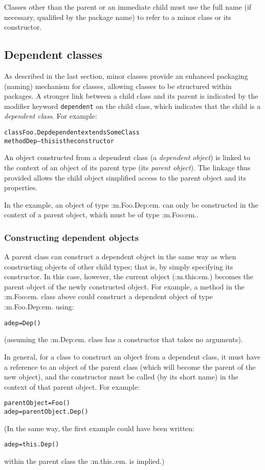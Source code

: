 Classes other than the parent or an immediate child must use the full
name (if necessary, qualified by the package name) to refer to a minor
class or its constructor.
\subsection{Dependent classes}\label{"id"}
\index{,}
\index{,}
\index{,}
 
As described in the last section, minor classes provide an enhanced
packaging (naming) mechanism for classes, allowing classes to be
structured within packages.  A stronger link between a child class and
its parent is indicated by the modifier keyword \texttt{dependent} on the
child class, which indicates that the child is a \emph{dependent class}.
For example:
\begin{alltt}
class Foo.Dep dependent extends SomeClass
  method Dep   -- this is the constructor
\end{alltt}
 
An object constructed from a dependent class (a \emph{dependent
object}) is linked to the context of an object of its parent
type (its \emph{parent object}).
The linkage thus provided allows the child object simplified access to
the parent object and its properties.
 
In the example, an object of type :m.Foo.Dep:em. can only be constructed
in the context of a parent object, which must be of type :m.Foo:em..
\subsubsection{Constructing dependent objects}
 
A parent class can construct a dependent object in the same way as when
constructing objects of other child types; that is, by simply specifying
its constructor.  In this case, however, the current object
(:m.this:em.) becomes the parent object of the newly constructed object.
For example, a method in the :m.Foo:em. class above could construct a
dependent object of type :m.Foo.Dep:em. using:
\begin{alltt}
adep=Dep()
\end{alltt}
(assuming the :m.Dep:em. class has a constructor that takes no
arguments).
 
In general, for a class to construct an object from a dependent class,
it must have a reference to an object of the parent class (which will
become the parent of the new object), and the constructor must be called
(by its short name) in the context of that parent object.  For example:
\begin{alltt}
parentObject=Foo()
adep=parentObject.Dep()
\end{alltt}
(In the same way, the first example could have been written:
\begin{alltt}
adep=this.Dep()
\end{alltt}
within the parent class the :m.this.:em. is implied.)
 
